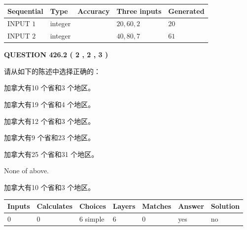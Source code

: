 \documentclass{ctexart}
\begin{document}
   
  
  
\noindent\begin{tabular}{|l|l|l|l|l|}
\hline
 Sequential & Type & Accuracy & Three inputs & Generated \\ 
\hline
 
 
  INPUT $  1 $ & integer &  & $
 20
 , 
 60
 , 
 2
 $ & $ 20 $ 
 \\  \hline  
 
 
  INPUT $  2 $ & integer &  & $
 40
 , 
 80
 , 
 7
 $ & $ 61 $ 
 \\  \hline  
 \end{tabular}
   
   
  
\vspace{0.2in}
  
{\textbf{\Large{QUESTION
426.2 
 ( 2 , 2 , 3 )
}}}
  
  
请从如下的陈述中选择正确的：
 
 
加拿大有10 个省和3 个地区。
 
 
加拿大有19 个省和4 个地区。
 
 
加拿大有12 个省和3 个地区。
 
 
加拿大有9 个省和23 个地区。
 
 
加拿大有25 个省和31 个地区。
 
 
 None of above.
 
 
\noindent{}
 
 
加拿大有10 个省和3 个地区。
 
 
\noindent{}
 
 
   
   
   
   
\noindent\begin{tabular}{|l|l|l|l|l|l|l|}
 \hline
Inputs & Calculates & Choices & Layers & Matches & Answer & Solution \\ \hline
 0  & 
 0  & 
 6
  simple  
  & 
 6  & 
 0  & 
  yes & 
  no 
  \\ \hline
 \end{tabular}
   
   
   
   
\noindent{}
   
\end{document}
